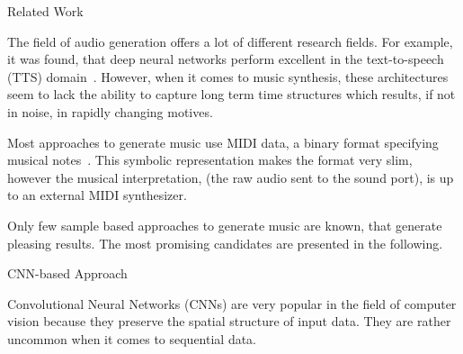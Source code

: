 \documentclass[final,hyperref={pdfpagelabels=false}]{beamer}
\newcommand{\blocktextwidth}{0.93\textwidth}
\begin{document}
\begin{frame}[t]
\begin{columns}[t]
\begin{column}{.31\textwidth}
            
\begin{block}{Related Work}
\begin{minipage}[]{\blocktextwidth}
The field of audio generation offers a lot of different research fields.
For example, it was found, that deep neural networks perform excellent in the text-to-speech (TTS) domain~\cite{van2016wavenet, arik2017deep, chung2015recurrent, kalchbrenner2018efficient}.
However, when it comes to music synthesis, these architectures seem to lack the ability to capture long term time structures which results, if not in noise, in rapidly changing motives.

Most approaches to generate music use MIDI data, a binary format specifying musical notes~\cite{yang2017midinet, mogren2016c, tikhonov2017music, hennig2017classifying}.
This symbolic representation makes the format very slim, however the musical interpretation, (the raw audio sent to the sound port), is up to an external MIDI synthesizer.

Only few sample based approaches to generate music are known, that generate pleasing results.
The most promising candidates are presented in the following.

\end{minipage}
\end{block}


\begin{block}{CNN-based Approach}
\begin{minipage}[]{\blocktextwidth}
Convolutional Neural Networks (CNNs) are very popular in the field of computer vision because they preserve the spatial structure of input data.
They are rather uncommon when it comes to sequential data.


\end{minipage}
\end{block}
\end{column}
\end{columns}
\end{frame}
\end{document}
